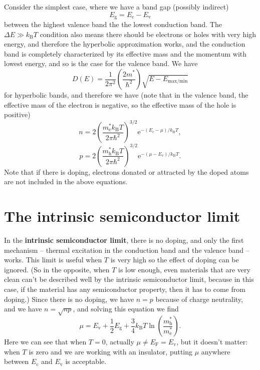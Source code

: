 \documentclass[hyperref, a4paper]{article}
\newcommand*{\ee}{\mathrm{e}}
\newcommand*{\concept}[1]{{\textbf{#1}}}
\begin{document}
Consider the simplest case, where we have a band gap (possibly indirect) 
\begin{equation}
    E_{\text{g}} = E_{\text{c}} - E_{\text{v}}
\end{equation}
between the highest valence band the the lowest conduction band.
The $\Delta E \gg k_{\text{B}} T$ condition also means there should be 
electrons or holes with very high energy,
and therefore the hyperbolic approximation works, 
and the conduction band is completely characterized by its effective mass 
and the momentum with lowest energy,
and so is the case for the valence band.
We have 
\begin{equation}
    D(E) = \frac{1}{2 \pi^2} \left( \frac{2 m^*}{\hbar^2} \right) \sqrt{E - E_{\text{max/min}}}
\end{equation}
for hyperbolic bands,
and therefore we have (note that in the valence band, the effective mass of the electron is negative,
so the effective mass of the hole is positive) 
\begin{equation}
    n = 2 \left( \frac{m_\text{e}^* k_{\text{B}} T}{2 \pi \hbar^2} \right)^{3/2} 
    \ee^{- (E_{\text{c}} - \mu) / k_{\text{B}} T},
    \label{eq:n-def}
\end{equation}
\begin{equation}
    p = 2 \left( \frac{m_\text{h}^* k_{\text{B}} T}{2 \pi \hbar^2} \right)^{3/2} 
    \ee^{- (\mu - E_{\text{v}}) / k_{\text{B}} T}.
\end{equation}
Note that if there is doping, electrons donated or attracted by the doped atoms 
are not included in the above equations.

\section{The intrinsic semiconductor limit}

In the \concept{intrinsic semiconductor limit},
there is no doping, and only the first mechanism 
-- thermal excitation in the conduction band and the valence band --
works. 
This limit is useful 
when $T$ is very high so the effect of doping can be ignored.
(So in the opposite, 
when $T$ is low enough, 
even materials that are very clean can't be described well by the intrinsic semiconductor limit,
because in this case, if the material has any semiconductor property,
then it has to come from doping.)
Since there is no doping, we have $n = p$ because of charge neutrality,
and we have $n = \sqrt{np}$,
and solving this equation we find 
\begin{equation}
    \mu = E_{\text{v}} + \frac{1}{2} E_{\text{g}} + \frac{3}{4} k_{\text{B}} T \ln(\frac{m_\text{h}^*}{m_{\text{e}}^*}).
    \label{eq:mu-nat}
\end{equation}
Here we can see that when $T = 0$, 
actually $\mu \neq E_{\text{F}} = E_{\text{v}}$,
but it doesn't matter:
when $T$ is zero and we are working with an insulator,
putting $\mu$ anywhere between $E_{\text{c}}$ and $E_{\text{v}}$ is acceptable.
\end{document}
